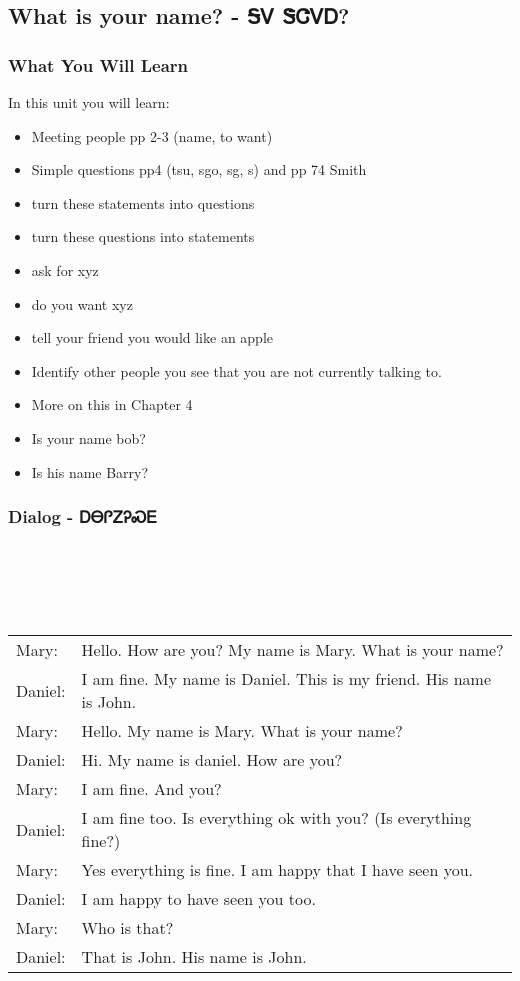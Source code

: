 \begin{multicols}
\chapter{What is your name? - ᎦᏙ ᏕᏣᏙᎠ?}
\subsection{What You Will Learn}
In this unit you will learn:
\begin{itemize}
\item Meeting people pp 2-3 (name, to want)
\item Simple questions pp4 (tsu, sgo, sg, s) and pp 74 Smith
\item turn these statements into questions
\item turn these questions into statements
\item ask for xyz
\item do you want xyz
\item tell your friend you would like an apple
\item Identify other people you see that you are not currently talking to.
\item More on this in Chapter 4
\item Is your name bob?
\item Is his name Barry?
\end{itemize}\newpage

\newpage\subsection{Dialog - ᎠᎾᎵᏃᎮᏍᎬ}
\begin{tabular}{p{2cm} p{11cm}}
\end{tabular}
\\
\\
\\
\noindent\begin{tabular}{p{2cm} p{11cm}}Mary: & Hello.  How are you?  My name is Mary.  What is your name?\\
Daniel: & I am fine.  My name is Daniel.  This is my friend.  His name is John.\\
Mary: & Hello.  My name is Mary.  What is your name?\\
Daniel: & Hi.  My name is daniel.  How are you?\\
Mary: & I am fine.  And you?\\
Daniel: & I am fine too.  Is everything ok with you? (Is everything fine?)\\
Mary: & Yes everything is fine.  I am happy that I have seen you.\\
Daniel: & I am happy to have seen you too.\\
Mary: & Who is that?\\
Daniel: & That is John.  His name is John.\\
\end{tabular}
\vfill\newpage{}

\end{multicols}
